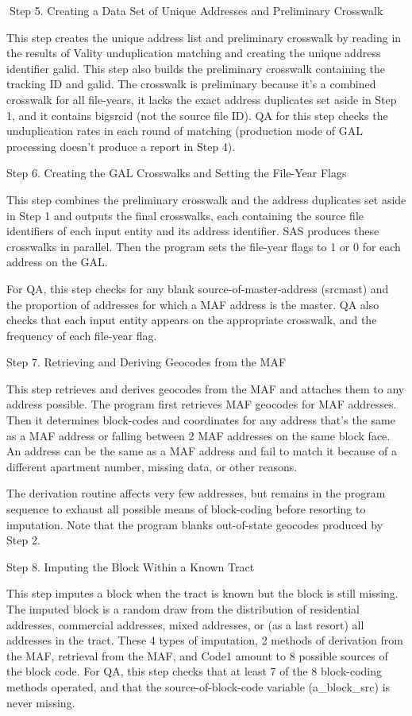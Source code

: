                                 Step 5. Creating a Data Set of Unique Addresses and Preliminary Crosswalk

This step creates the unique address list and preliminary crosswalk by reading in the results of Vality
unduplication matching and creating the unique address identifier galid. This step also builds the
preliminary crosswalk containing the tracking ID and galid. The crosswalk is preliminary because it's a
combined crosswalk for all file-years, it lacks the exact address duplicates set aside in Step 1, and it
contains bigsrcid (not the source file ID). QA for this step checks the unduplication rates in each round
of matching (production mode of GAL processing doesn't produce a report in Step 4). 

Step 6. Creating the GAL Crosswalks and Setting the File-Year Flags

This step combines the preliminary crosswalk and the address duplicates set aside in Step 1 and outputs
the final crosswalks, each containing the source file identifiers of each input entity and its address
identifier. SAS produces these crosswalks in parallel. Then the program sets the file-year flags to 1 or 0
for each address on the GAL.

For QA, this step checks for any blank source-of-master-address (srcmast) and the proportion of
addresses for which a MAF address is the master. QA also checks that each input entity appears on the
appropriate crosswalk, and the frequency of each file-year flag. 

     Step 7. Retrieving and Deriving Geocodes from the MAF

This step retrieves and derives geocodes from the MAF and attaches them to any address possible. The
program first retrieves MAF geocodes for MAF addresses. Then it determines block-codes and
coordinates for any address that's the same as a MAF address or falling between 2 MAF addresses on the
same block face. An address can be the same as a MAF address and fail to match it because of a different
apartment number, missing data, or other reasons. 

The derivation routine affects very few addresses, but remains in the program sequence to exhaust all
possible means of block-coding before resorting to imputation. Note that the program blanks out-of-state
geocodes produced by Step 2. 

        Step 8. Imputing the Block Within a Known Tract

This step imputes a block when the tract is known but the block is still missing. The imputed block is a
random draw from the distribution of residential addresses, commercial addresses, mixed addresses, or
(as a last resort) all addresses in the tract. These 4 types of imputation, 2 methods of derivation from the
MAF, retrieval from the MAF, and Code1 amount to 8 possible sources of the block code. For QA, this
step checks that at least 7 of the 8 block-coding methods operated, and that the source-of-block-code
variable (a_block_src) is never missing.

